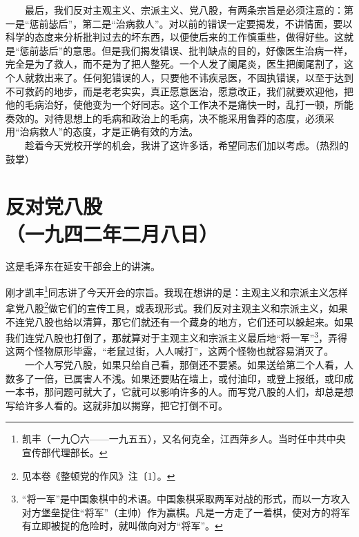 \documentclass[cn,11pt,chinese]{elegantbook}
\def\myformat#1{\hfil\hfil #1}
\begin{document}
　　最后，我们反对主观主义、宗派主义、党八股，有两条宗旨是必须注意的：第一是“惩前毖后”，第二是“治病救人”。对以前的错误一定要揭发，不讲情面，要以科学的态度来分析批判过去的坏东西，以便使后来的工作慎重些，做得好些。这就是“惩前毖后”的意思。但是我们揭发错误、批判缺点的目的，好像医生治病一样，完全是为了救人，而不是为了把人整死。一个人发了阑尾炎，医生把阑尾割了，这个人就救出来了。任何犯错误的人，只要他不讳疾忌医，不固执错误，以至于达到不可救药的地步，而是老老实实，真正愿意医治，愿意改正，我们就要欢迎他，把他的毛病治好，使他变为一个好同志。这个工作决不是痛快一时，乱打一顿，所能奏效的。对待思想上的毛病和政治上的毛病，决不能采用鲁莽的态度，必须采用“治病救人”的态度，才是正确有效的方法。\\
　　趁着今天党校开学的机会，我讲了这许多话，希望同志们加以考虑。（热烈的鼓掌）\\
\newpage\section*{\myformat{反对党八股}\\\myformat{（一九四二年二月八日）}}
\begin{introduction}\item  这是毛泽东在延安干部会上的讲演。\end{introduction}
刚才凯丰\footnote[1]{ 凯丰（一九〇六——一九五五），又名何克全，江西萍乡人。当时任中共中央宣传部代理部长。}同志讲了今天开会的宗旨。我现在想讲的是：主观主义和宗派主义怎样拿党八股\footnote[2]{ 见本卷《整顿党的作风》注〔1〕。}做它们的宣传工具，或表现形式。我们反对主观主义和宗派主义，如果不连党八股也给以清算，那它们就还有一个藏身的地方，它们还可以躲起来。如果我们连党八股也打倒了，那就算对于主观主义和宗派主义最后地“将一军”\footnote[3]{ “将一军”是中国象棋中的术语。中国象棋采取两军对战的形式，而以一方攻入对方堡垒捉住“将军”（主帅）作为赢棋。凡是一方走了一着棋，使对方的将军有立即被捉的危险时，就叫做向对方“将军”。}，弄得这两个怪物原形毕露，“老鼠过街，人人喊打”，这两个怪物也就容易消灭了。\\
　　一个人写党八股，如果只给自己看，那倒还不要紧。如果送给第二个人看，人数多了一倍，已属害人不浅。如果还要贴在墙上，或付油印，或登上报纸，或印成一本书，那问题可就大了，它就可以影响许多的人。而写党八股的人们，却总是想写给许多人看的。这就非加以揭穿，把它打倒不可。\\
\end{document}
